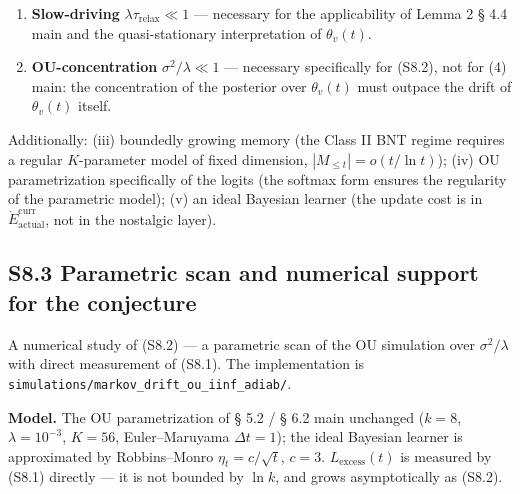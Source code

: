 \documentclass[pdflatex,sn-mathphys-ay]{sn-jnl}
\providecommand{\tightlist}{\setlength{\itemsep}{0pt}\setlength{\parskip}{0pt}}
\begin{document}
\begin{enumerate}

\def\labelenumi{\arabic{enumi}.}

\tightlist

\item

  \textbf{Slow-driving} \(\lambda \tau_{\text{relax}} \ll 1\) --- necessary for the applicability of Lemma 2 § 4.4 main and the quasi-stationary interpretation of \(\theta_v(t)\).

\item

  \textbf{OU-concentration} \(\sigma^2/\lambda \ll 1\) --- necessary specifically for (S8.2), not for (4) main: the concentration of the posterior over \(\theta_v(t)\) must outpace the drift of \(\theta_v(t)\) itself.

\end{enumerate}



Additionally: (iii) boundedly growing memory (the Class II BNT regime requires a regular \(K\)-parameter model of fixed dimension, \(|M_{\le t}| = o(t/\ln t)\)); (iv) OU parametrization specifically of the logits (the softmax form ensures the regularity of the parametric model); (v) an ideal Bayesian learner (the update cost is in \(\dot E_{\text{actual}}^{\text{curr}}\), not in the nostalgic layer).



\subsection*{S8.3 Parametric scan and numerical support for the conjecture}\label{s8.3-parametric-scan-and-numerical-support-for-the-conjecture}



A numerical study of (S8.2) --- a parametric scan of the OU simulation over \(\sigma^2/\lambda\) with direct measurement of (S8.1). The implementation is \texttt{simulations/markov\_drift\_ou\_iinf\_adiab/}.



\textbf{Model.} The OU parametrization of § 5.2 / § 6.2 main unchanged (\(k = 8\), \(\lambda = 10^{-3}\), \(K = 56\), Euler--Maruyama \(\Delta t = 1\)); the ideal Bayesian learner is approximated by Robbins--Monro \(\eta_t = c/\sqrt t\), \(c = 3\). \(L_{\text{excess}}(t)\) is measured by (S8.1) directly --- it is not bounded by \(\ln k\), and grows asymptotically as (S8.2).
\end{document}
